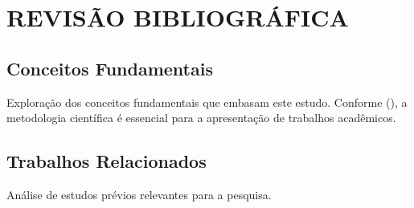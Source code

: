\chapter{REVISÃO BIBLIOGRÁFICA}
\section{Conceitos Fundamentais}
Exploração dos conceitos fundamentais que embasam este estudo. Conforme \citeauthor{oliveiranetto2008} (\citeyear{oliveiranetto2008}), a metodologia científica é essencial para a apresentação de trabalhos acadêmicos. 

\section{Trabalhos Relacionados}
Análise de estudos prévios relevantes para a pesquisa.
